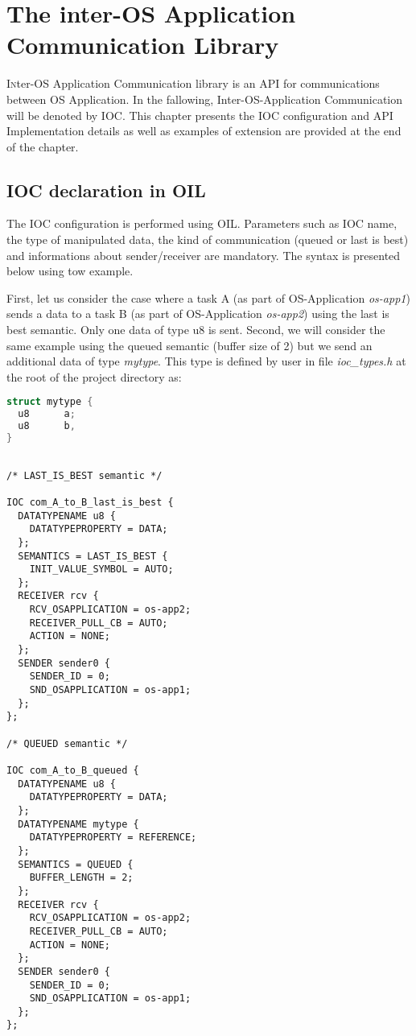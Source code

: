 
\chapter{The inter-OS Application Communication Library}

\lettrine{I}nter-OS Application Communication library is an API for communications between OS Application. In the fallowing, Inter-OS-Application Communication will be denoted by IOC.
This chapter presents the IOC configuration and API
Implementation details as well as examples of extension are provided at the end of the chapter.

\section{IOC declaration in OIL}

The IOC configuration is performed using OIL. Parameters such as IOC name, the type of manipulated data, the kind of communication (queued or last is best) and informations about sender/receiver are mandatory. The syntax is presented below using tow example.

First, let us consider the case where a task A (as part of OS-Application \textit{os-app1}) sends a data to a task B (as part of OS-Application \textit{os-app2}) using the last is best semantic. Only one data of type u8 is sent. Second, we will consider the same example using the queued semantic (buffer size of 2) but we send an additional data of type \textit{mytype}. This type is defined by user in file \textit{ioc_types.h} at the root of the project directory as:

\begin{lstlisting}[language=C]
struct mytype {
  u8	  a;
  u8	  b,
}
\end{lstlisting}

\begin{lstlisting}[language=OIL]

/* LAST_IS_BEST semantic */

IOC com_A_to_B_last_is_best {
  DATATYPENAME u8 {
    DATATYPEPROPERTY = DATA;
  };
  SEMANTICS = LAST_IS_BEST {
    INIT_VALUE_SYMBOL = AUTO;
  };
  RECEIVER rcv {
    RCV_OSAPPLICATION = os-app2;
    RECEIVER_PULL_CB = AUTO;
    ACTION = NONE;
  };
  SENDER sender0 {
    SENDER_ID = 0;
    SND_OSAPPLICATION = os-app1;
  };
}; 

/* QUEUED semantic */

IOC com_A_to_B_queued {
  DATATYPENAME u8 {
    DATATYPEPROPERTY = DATA;
  };
  DATATYPENAME mytype {
    DATATYPEPROPERTY = REFERENCE;
  };
  SEMANTICS = QUEUED {
    BUFFER_LENGTH = 2;
  };
  RECEIVER rcv {
    RCV_OSAPPLICATION = os-app2;
    RECEIVER_PULL_CB = AUTO;
    ACTION = NONE;
  };
  SENDER sender0 {
    SENDER_ID = 0;
    SND_OSAPPLICATION = os-app1;
  };
}; 

\end{lstlisting}


